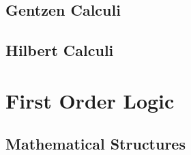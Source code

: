 

\subsection{Gentzen Calculi}



\subsection{Hilbert Calculi}



\vfill\break

\section{First Order Logic}

\subsection{Mathematical Structures}



\vfill\break

\index

\bye

